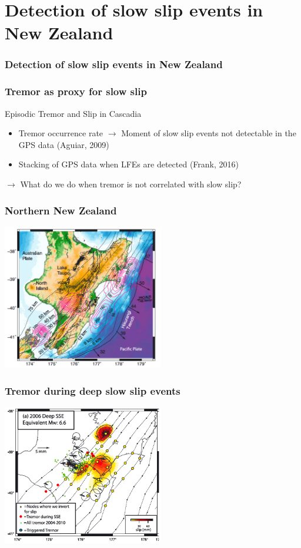 \documentclass{beamer}
\begin{document}
	\section{Detection of slow slip events in New Zealand}

	\begin{frame}
		\frametitle{Detection of slow slip events in New Zealand}
	\end{frame}

	\begin{frame}
		\frametitle{Tremor as proxy for slow slip}
		Episodic Tremor and Slip in Cascadia
		\begin{itemize}
			\item Tremor occurrence rate $\rightarrow$ Moment of slow slip events not detectable in the GPS data (Aguiar, 2009)
			\item Stacking of GPS data when LFEs are detected (Frank, 2016)
		\end{itemize}
		$\rightarrow$ What do we do when tremor is not correlated with slow slip?
	\end{frame}
		
	\begin{frame}
		\frametitle{Northern New Zealand}
		\begin{center}
			\includegraphics[trim={0cm 0cm 0cm 0cm}, clip, width=7cm]{articles/wallace_eberhart-phillips_2013_1.png}
		\end{center}
	\end{frame}

	\begin{frame}
		\frametitle{Tremor during deep slow slip events}
		\begin{center}
			\includegraphics[trim={0cm 0cm 0cm 0cm}, clip, width=7cm]{articles/wallace_eberhart-phillips_2013_3a.png}
		\end{center}
	\end{frame}
\end{document}
